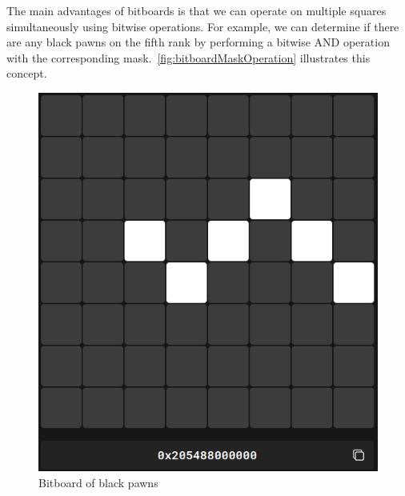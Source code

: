 \noindent The main advantages of bitboards is that we can operate on multiple squares simultaneously using bitwise operations. For example, we can determine if there are any black pawns on the fifth rank by performing a bitwise AND operation with the corresponding mask.~\cref{fig:bitboardMaskOperation} illustrates this concept.

\begin{figure}
    \centering
    \begin{minipage}[c]{0.30\textwidth}
        \centering
        \includegraphics[width=\textwidth]{Imagenes/bitboard_black_pawns.png}
        \caption*{Bitboard of black pawns}
    \end{minipage}
    \hfill
    \begin{minipage}[c]{0.30\textwidth}
        \centering

\end{minipage}
\end{figure}
